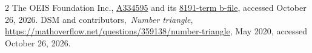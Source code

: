 \documentclass[10pt]{article}
\begin{document}
\begin{thebibliography}{2}
 The OEIS Foundation Inc.,
\href{https://oeis.org/A334595}{A334595} and its
\href{https://oeis.org/A334595/b334595.txt}{8191-term b-file},
accessed October 26, 2026.
 DSM and contributors,\ \emph{Number triangle},
\url{https://mathoverflow.net/questions/359138/number-triangle},
May 2020, accessed October 26, 2026.
\end{thebibliography}
\end{document}
